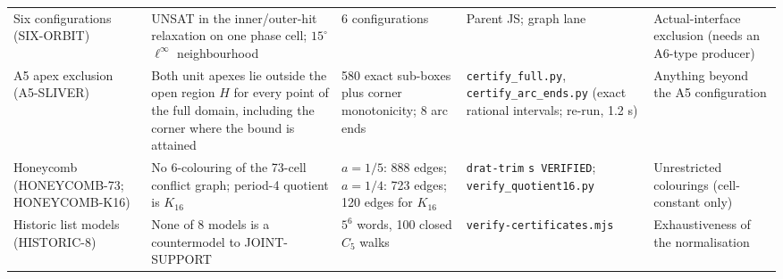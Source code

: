 \documentclass[11pt]{article}
\theoremstyle{definition}
\theoremstyle{remark}
\begin{document}
\begin{table}[ht]
\begin{tabular}{P{0.15\textwidth}P{0.25\textwidth}P{0.15\textwidth}P{0.14\textwidth}P{0.21\textwidth}}
Six configurations (SIX-ORBIT) & UNSAT in the inner/outer-hit relaxation on one phase cell; $15^\circ$ $\ell^\infty$ neighbourhood & 6 configurations & Parent JS; graph lane & Actual-interface exclusion (needs an A6-type producer) \\
A5 apex exclusion (A5-SLIVER) & Both unit apexes lie outside the open region $H$ for every point of the full domain, including the corner where the bound is attained & 580 exact sub-boxes plus corner monotonicity; 8 arc ends & \texttt{certify\_\allowbreak{}full.py}, \texttt{certify\_\allowbreak{}arc\_\allowbreak{}ends.py} (exact rational intervals; re-run, 1.2 s) & Anything beyond the A5 configuration \\
Honeycomb (HONEYCOMB-73; HONEYCOMB-K16) & No 6-colouring of the 73-cell conflict graph; period-4 quotient is $K_{16}$ & $a=1/5$: 888 edges; $a=1/4$: 723 edges; 120 edges for $K_{16}$ & \texttt{drat-trim} \texttt{s VERIFIED}; \texttt{verify\_\allowbreak{}quotient16.\allowbreak{}py} & Unrestricted colourings (cell-constant only) \\
Historic list models (HISTORIC-8) & None of 8 models is a countermodel to JOINT-SUPPORT & $5^6$ words, 100 closed $C_5$ walks & \texttt{verify-\allowbreak{}certificates\allowbreak{}.\allowbreak{}mjs} & Exhaustiveness of the normalisation \\
\hline
\end{tabular}
\end{table}
\end{document}
